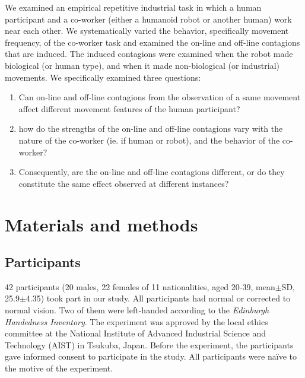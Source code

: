 \documentclass[a4paper, 12pt, oneside]{Thesis}  %
\begin{document}
We examined an empirical repetitive industrial task in which a human participant and a co-worker (either a humanoid robot or another human) work near each other. We systematically varied the behavior, specifically movement frequency, of the co-worker task and examined the on-line and off-line contagions that are induced. The induced contagions were examined when the robot made biological (or human type), and when it made non-biological (or industrial) movements. We specifically examined three questions:

\begin{enumerate}
	\item Can on-line and off-line contagions from the observation of a same movement affect different movement features of the human participant?
	\item how do the strengths of the on-line and off-line contagions vary with the nature of the co-worker (ie. if human or robot), and the behavior of the co-worker?
	\item Consequently, are the on-line and off-line contagions different, or do they constitute the same effect observed at different instances?
\end{enumerate}





\clearpage
\section{Materials and methods}

\subsection{Participants}

42 participants (20 males, 22 females of 11 nationalities, aged 20-39, mean$\pm$SD, 25.9$\pm$4.35) took part in our study. All participants had normal or corrected to normal vision. Two of them were left-handed according to the {\it Edinburgh Handedness Inventory}. The experiment was approved by the local ethics committee at the National Institute of Advanced Industrial Science and Technology (AIST) in Tsukuba, Japan. Before the experiment, the participants gave informed consent to participate in the study. All participants were na{\"i}ve to the motive of the experiment. 
\end{document}
